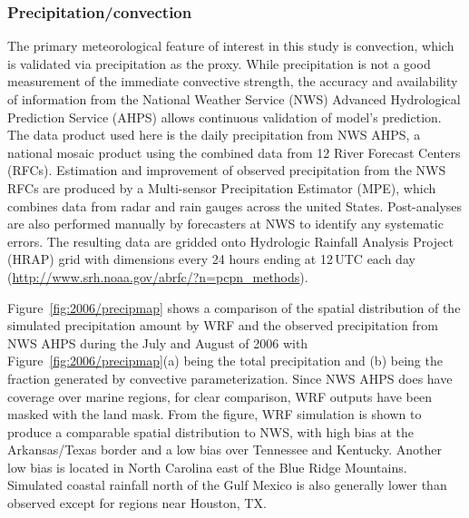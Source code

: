 
\subsubsection{Precipitation/convection}

The primary meteorological feature of interest in this study is convection, which is validated via precipitation
as the proxy. While precipitation is not a good measurement of the immediate convective strength, the
accuracy and availability of information from the National Weather Service (NWS) Advanced Hydrological
Prediction Service (AHPS) allows continuous validation of model's prediction. The data product used here is the
daily precipitation from NWS AHPS, a national mosaic product using the combined data from 12 River Forecast
Centers (RFCs). Estimation and improvement of observed precipitation from the NWS RFCs are produced by
a Multi-sensor Precipitation Estimator (MPE), which combines data from radar and rain gauges across
the united States. Post-analyses are also performed manually by forecasters at NWS to identify any systematic
errors. The resulting data are gridded onto Hydrologic Rainfall Analysis Project (HRAP) grid with dimensions
{} every 24 hours ending at 12\,\unit{UTC} each day
(\url{http://www.srh.noaa.gov/abrfc/?n=pcpn\_methods}).


Figure~\ref{fig:2006/precipmap} shows a comparison of the spatial distribution of the simulated precipitation
amount by WRF and the observed precipitation from NWS AHPS during the July and August of 2006 with
Figure~\ref{fig:2006/precipmap}(a) being the total precipitation and (b) being the fraction generated by
convective parameterization. Since NWS AHPS does have coverage over marine regions, for clear comparison,
WRF outputs have been masked with the land mask. From the figure, WRF simulation is shown to produce a
comparable spatial distribution to NWS, with high bias at the Arkansas/Texas border and a low bias over
Tennessee and Kentucky. Another low bias is located in North Carolina east of the Blue Ridge Mountains.
Simulated coastal rainfall north of the Gulf Mexico is also generally lower than observed except for regions
near Houston, TX.

